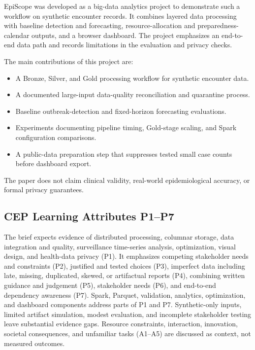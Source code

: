 \documentclass[conference]{IEEEtran}
\begin{document}
EpiScope was developed as a big-data analytics project to demonstrate such a workflow on synthetic encounter records. It combines layered data processing with baseline detection and forecasting, resource-allocation and preparedness-calendar outputs, and a browser dashboard. The project emphasizes an end-to-end data path and records limitations in the evaluation and privacy checks.

The main contributions of this project are:
\begin{itemize}
    \item A Bronze, Silver, and Gold processing workflow for synthetic encounter data.
    \item A documented large-input data-quality reconciliation and quarantine process.
    \item Baseline outbreak-detection and fixed-horizon forecasting evaluations.
    \item Experiments documenting pipeline timing, Gold-stage scaling, and Spark configuration comparisons.
    \item A public-data preparation step that suppresses tested small case counts before dashboard export.
\end{itemize}

The paper does not claim clinical validity, real-world epidemiological accuracy, or formal privacy guarantees.

\subsection{CEP Learning Attributes P1--P7}
The brief expects evidence of distributed processing, columnar storage, data integration and quality, surveillance time-series analysis, optimization, visual design, and health-data privacy (P1). It emphasizes competing stakeholder needs and constraints (P2), justified and tested choices (P3), imperfect data including late, missing, duplicated, skewed, or artifactual reports (P4), combining written guidance and judgement (P5), stakeholder needs (P6), and end-to-end dependency awareness (P7). Spark, Parquet, validation, analytics, optimization, and dashboard components address parts of P1 and P7. Synthetic-only inputs, limited artifact simulation, modest evaluation, and incomplete stakeholder testing leave substantial evidence gaps. Resource constraints, interaction, innovation, societal consequences, and unfamiliar tasks (A1--A5) are discussed as context, not measured outcomes.
\end{document}
